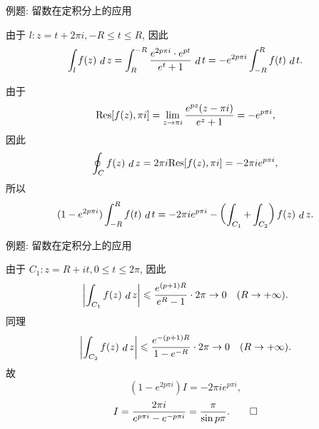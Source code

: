 \begin{frame}{例题: 留数在定积分上的应用}
\beqskip{5pt}
\begin{solutionc}
\indent
由于 $l:z=t+2\pi i,-R\le t\le R$,
\onslide<+->
因此
\[\int_l f(z)\,\mathop{d} z
=\int_R^{-R}\frac{e^{2p\pi i}\cdot e^{pt}}{e^t+1}\,\mathop{d} t
=-e^{2p\pi i}\int_{-R}^Rf(t)\,\mathop{d} t.\]

\indent
由于
\[{\mathrm{Res}}[f(z),\pi i]
=\lim_{z\to\pi i}\frac{e^{pz}(z-\pi i)}{e^z+1}=-e^{p\pi i},\]
\onslide<+->
因此
\[\oint_Cf(z)\,\mathop{d} z=2\pi i{\mathrm{Res}}[f(z),\pi i]
=-2\pi ie^{p\pi i},\]
\onslide<+->
所以
\[(1-e^{2p\pi i})\int_{-R}^Rf(t)\,\mathop{d} t=-2\pi ie^{p\pi i}-\left(\int_{C_1}+\int_{C_2}\right)f(z)\,\mathop{d} z.\]
\end{solutionc}
\endgroup
\end{frame}


\begin{frame}{例题: 留数在定积分上的应用}
\begin{solutione}
\indent
由于 $C_1:z=R+it,0\le t\le 2\pi$,
\onslide<+->
因此
\[\left|\int_{C_1}f(z)\,\mathop{d} z\right|\leqslant \frac{e^{(p+1)R}}{e^R-1}\cdot 2\pi\to 0\quad(R\to+\infty).\]
\onslide<+->
同理
\[\left|\int_{C_2}f(z)\,\mathop{d} z\right|\leqslant \frac{e^{-(p+1)R}}{1-e^{-R}}\cdot 2\pi\to 0\quad(R\to+\infty).\]
\onslide<+->
故
\[(1-e^{2p\pi i})I=-2\pi ie^{p\pi i},\]
\onslide<+->
\[I=\frac{2\pi i}{e^{p\pi i}-e^{-p\pi i}}=\frac{\pi}{\sin p\pi}.\qedhere\]
\end{solutione}
\end{frame}

